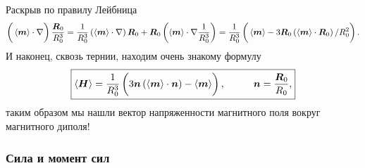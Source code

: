 Раскрыв по правилу Лейбница
\begin{equation*}
    \left( \vph
        \left\langle \vc{m}\right\rangle \cdot \nabla
    \right) \frac{\vc{R}_0}{R_0^3} = 
    \frac{1}{R_0^3} \left(
        \left\langle \vc{m}\right\rangle \cdot \nabla
    \right) \vc{R}_0 + \vc{R}_0 
    \left(
        \left\langle \vc{m}\right\rangle \cdot \nabla \frac{1}{R_0^3} 
    \right) =
    \frac{1}{R_0^3} \left( \vph
        \left\langle \vc{m}\right\rangle - 3 \vc{R}_0 \left(
            \left\langle \vc{m}\right\rangle \cdot \vc{R}_0
        \right) / R_0^2
    \right).
\end{equation*}
И наконец, сквозь тернии, находим очень знакому формулу
\begin{equation}
    \boxed{
        \left\langle \vc{H}\right\rangle = \frac{1}{R_0^3} 
        \left( \vph
            3 \vc{n} \left(
                \left\langle \vc{m}\right\rangle \cdot \vc{n}
            \right) - \left\langle \vc{m}\right\rangle
        \right), \hspace{1cm} 
        \vc{n} = \frac{\vc{R}_0}{R_0},
    }
\end{equation}
таким образом мы нашли вектор напряженности магнитного поля вокруг магнитного диполя!

\subsubsection*{Сила и момент сил}
